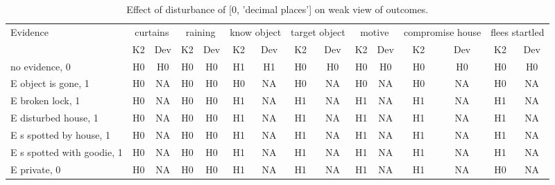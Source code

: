 \begin{table}\begin{tabular}{l|cc|cc|cc|cc|cc|cc|cc}\toprule\multirow{2}{*}{Evidence} & \multicolumn{2}{c}{curtains}& \multicolumn{2}{c}{raining}& \multicolumn{2}{c}{know object}& \multicolumn{2}{c}{target object}& \multicolumn{2}{c}{motive}& \multicolumn{2}{c}{compromise house}& \multicolumn{2}{c}{flees startled}\\& {K2} & {Dev}& {K2} & {Dev}& {K2} & {Dev}& {K2} & {Dev}& {K2} & {Dev}& {K2} & {Dev}& {K2} & {Dev}\\\midrule
no evidence, 0 & H0&H0&H0&H0&H1&H1&H0&H0&H0&H0&H0&H0&H0&H0\\E object is gone, 1 & \cellcolor{Bittersweet}H0&\cellcolor{Bittersweet}NA&H0&H0&\cellcolor{Bittersweet}H0&\cellcolor{Bittersweet}NA&\cellcolor{Bittersweet}H0&\cellcolor{Bittersweet}NA&\cellcolor{Bittersweet}H0&\cellcolor{Bittersweet}NA&\cellcolor{Bittersweet}H0&\cellcolor{Bittersweet}NA&\cellcolor{Bittersweet}H0&\cellcolor{Bittersweet}NA\\E broken lock, 1 & \cellcolor{Bittersweet}H0&\cellcolor{Bittersweet}NA&H0&H0&\cellcolor{Bittersweet}H1&\cellcolor{Bittersweet}NA&\cellcolor{Bittersweet}H1&\cellcolor{Bittersweet}NA&\cellcolor{Bittersweet}H1&\cellcolor{Bittersweet}NA&\cellcolor{Bittersweet}H1&\cellcolor{Bittersweet}NA&\cellcolor{Bittersweet}H1&\cellcolor{Bittersweet}NA\\E disturbed house, 1 & \cellcolor{Bittersweet}H0&\cellcolor{Bittersweet}NA&H0&H0&\cellcolor{Bittersweet}H1&\cellcolor{Bittersweet}NA&\cellcolor{Bittersweet}H1&\cellcolor{Bittersweet}NA&\cellcolor{Bittersweet}H1&\cellcolor{Bittersweet}NA&\cellcolor{Bittersweet}H1&\cellcolor{Bittersweet}NA&\cellcolor{Bittersweet}H1&\cellcolor{Bittersweet}NA\\E s spotted by house, 1 & \cellcolor{Bittersweet}H0&\cellcolor{Bittersweet}NA&H0&H0&\cellcolor{Bittersweet}H1&\cellcolor{Bittersweet}NA&\cellcolor{Bittersweet}H1&\cellcolor{Bittersweet}NA&\cellcolor{Bittersweet}H1&\cellcolor{Bittersweet}NA&\cellcolor{Bittersweet}H1&\cellcolor{Bittersweet}NA&\cellcolor{Bittersweet}H1&\cellcolor{Bittersweet}NA\\E s spotted with goodie, 1 & \cellcolor{Bittersweet}H0&\cellcolor{Bittersweet}NA&H0&H0&\cellcolor{Bittersweet}H1&\cellcolor{Bittersweet}NA&\cellcolor{Bittersweet}H1&\cellcolor{Bittersweet}NA&\cellcolor{Bittersweet}H1&\cellcolor{Bittersweet}NA&\cellcolor{Bittersweet}H1&\cellcolor{Bittersweet}NA&\cellcolor{Bittersweet}H1&\cellcolor{Bittersweet}NA\\E private, 0 & \cellcolor{Bittersweet}H0&\cellcolor{Bittersweet}NA&H0&H0&\cellcolor{Bittersweet}H1&\cellcolor{Bittersweet}NA&\cellcolor{Bittersweet}H1&\cellcolor{Bittersweet}NA&\cellcolor{Bittersweet}H1&\cellcolor{Bittersweet}NA&\cellcolor{Bittersweet}H1&\cellcolor{Bittersweet}NA&\cellcolor{Bittersweet}H0&\cellcolor{Bittersweet}NA\\\bottomrule\end{tabular}\caption{Effect of disturbance of [0, 'decimal places'] on weak view of outcomes.}\end{table}